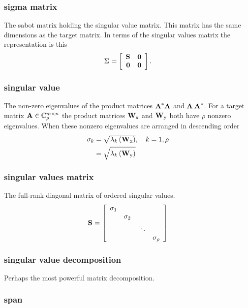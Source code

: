 \subsubsection*{sigma matrix}
The sabot matrix holding the singular value matrix. This matrix has the same dimensions as the target matrix. In terms of the singular values matrix the representation is this
\begin{equation}
  \sig{}=\mat{cc}{\ess{} & \zero\\ \zero & \zero}.
\end{equation}

\subsubsection*{singular value}
The non-zero eigenvalues of the product matrices $\prdm{*}$ and $\prdmm{*}$. For a target matrix $\Acc{m}{n}_{\rho}$ the product matrices $\W{x}$ and $\W{y}$ both have $\rho$ nonzero eigenvalues. When these nonzero eigenvalues are arranged in descending order
\begin{equation}
  \begin{split}
    \sigma_{k} &= \sqrt{\lambda_{k}\paren{\W{x}}}, \quad k=1,\rho\\
               &= \sqrt{\lambda_{k}\paren{\W{y}}}
  \end{split}
\end{equation}

\subsubsection*{singular values matrix}
The full-rank diagonal matrix of ordered singular values.
\begin{equation}
  \ess{}=\mat{ccccc}{\sigma_{1}\\&\sigma_{2}\\&&\ddots\\&&&\sigma_{\rho}}
\end{equation}


\subsubsection*{singular value decomposition}
Perhaps the most powerful matrix decomposition.

\subsubsection*{span}

